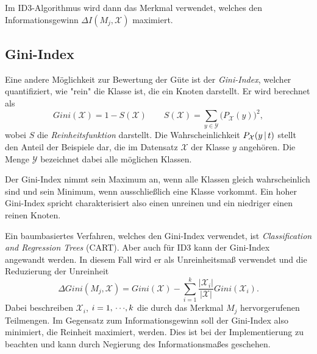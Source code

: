 			Im ID3-Algorithmus wird dann das Merkmal verwendet, welches den Informationsgewinn \( \Delta I(M_j, \mathcal{X}) \) maximiert.

		\subsection{Gini-Index}
			Eine andere Möglichkeit zur Bewertung der Güte ist der \emph{Gini-Index}, welcher quantifiziert, wie "rein" die Klasse ist, die ein Knoten darstellt. Er wird berechnet als
			\begin{equation}
				\textit{Gini}(\mathcal{X}) = 1 - S(\mathcal{X})
				\qquad
				S(\mathcal{X}) = \sum_{y \in \mathcal{Y}} \big( P_{\mathcal{X}}(y) \big)^2,
			\end{equation}
			wobei \(S\) die \emph{Reinheitsfunktion} darstellt. Die Wahrscheinlichkeit \( P_{\mathcal{X}}(y \,\vert\, t) \) stellt den Anteil der Beispiele dar, die im Datensatz \(\mathcal{X}\) der Klasse \(y\) angehören. Die Menge \(\mathcal{Y}\) bezeichnet dabei alle möglichen Klassen.

			Der Gini-Index nimmt sein Maximum an, wenn alle Klassen gleich wahrscheinlich sind und sein Minimum, wenn ausschließlich eine Klasse vorkommt. Ein hoher Gini-Index spricht charakterisiert also einen unreinen und ein niedriger einen reinen Knoten.

			Ein baumbasiertes Verfahren, welches den Gini-Index verwendet, ist \emph{Classification and Regression Trees} (CART). Aber auch für ID3 kann der Gini-Index angewandt werden. In diesem Fall wird er als Unreinheitsmaß verwendet und die Reduzierung der Unreinheit
			\begin{equation}
				\Delta \textit{Gini}(M_j, \mathcal{X}) = \textit{Gini}(\mathcal{X}) - \sum_{i = 1}^{k} \frac{\lvert \mathcal{X}_i \rvert}{\lvert \mathcal{X} \rvert} \textit{Gini}(\mathcal{X}_i).
			\end{equation}
			Dabei beschreiben \( \mathcal{X}_i \), \( i = 1,\,\cdots\!,k \) die durch das Merkmal \(M_j\) hervorgerufenen Teilmengen. Im Gegensatz zum Informationsgewinn soll der Gini-Index also minimiert, \dh die Reinheit maximiert, werden. Dies ist bei der Implementierung zu beachten und kann \bspw durch Negierung des Informationsmaßes geschehen.


